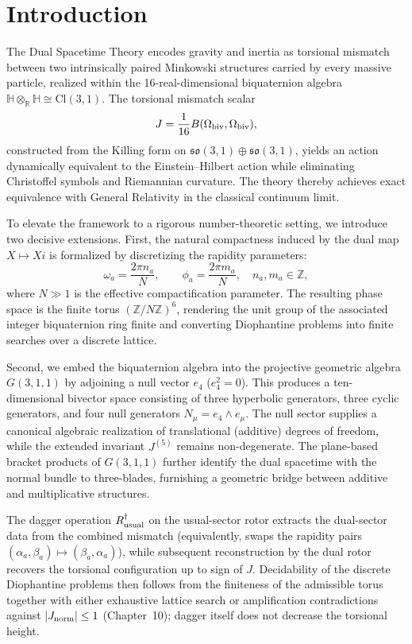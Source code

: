 \documentclass[dvipdfmx,a4paper]{article}
\theoremstyle{definition}
\theoremstyle{remark}
\newcommand{\Jnorm}{J_{\rm norm}}
\begin{document}
\section{Introduction}

The Dual Spacetime Theory encodes gravity and inertia as torsional mismatch between two intrinsically paired Minkowski structures carried by every massive particle, realized within the 16-real-dimensional biquaternion algebra \(\mathbb{H} \otimes_{\mathbb{R}} \mathbb{H} \cong \mathrm{Cl}(3,1)\). The torsional mismatch scalar
\[
J = \frac{1}{16} B(\Omega_{\rm biv}, \Omega_{\rm biv}),
\]
constructed from the Killing form on \(\mathfrak{so}(3,1) \oplus \mathfrak{so}(3,1)\), yields an action dynamically equivalent to the Einstein--Hilbert action while eliminating Christoffel symbols and Riemannian curvature. The theory thereby achieves exact equivalence with General Relativity in the classical continuum limit.

To elevate the framework to a rigorous number-theoretic setting, we introduce two decisive extensions. First, the natural compactness induced by the dual map \(X \mapsto Xi\) is formalized by discretizing the rapidity parameters:
\[
\omega_a = \frac{2\pi n_a}{N}, \qquad \phi_a = \frac{2\pi m_a}{N}, \quad n_a,m_a \in \mathbb{Z},
\]
where \(N \gg 1\) is the effective compactification parameter. The resulting phase space is the finite torus \((\mathbb{Z}/N\mathbb{Z})^6\), rendering the unit group of the associated integer biquaternion ring finite and converting Diophantine problems into finite searches over a discrete lattice.

Second, we embed the biquaternion algebra into the projective geometric algebra \(G(3,1,1)\) by adjoining a null vector \(e_4\) (\(e_4^2 = 0\)). This produces a ten-dimensional bivector space consisting of three hyperbolic generators, three cyclic generators, and four null generators \(N_\mu = e_4 \wedge e_\mu\). The null sector supplies a canonical algebraic realization of translational (additive) degrees of freedom, while the extended invariant \(J^{(5)}\) remains non-degenerate. The plane-based bracket products of \(G(3,1,1)\) further identify the dual spacetime with the normal bundle to three-blades, furnishing a geometric bridge between additive and multiplicative structures.

The dagger operation \(R_{\rm usual}^\dagger\) on the usual-sector rotor extracts the dual-sector data from the combined mismatch (equivalently, swaps the rapidity pairs \((\alpha_a,\beta_a)\mapsto(\beta_a,\alpha_a)\)), while subsequent reconstruction by the dual rotor recovers the torsional configuration up to sign of \(J\). Decidability of the discrete Diophantine problems then follows from the finiteness of the admissible torus together with either exhaustive lattice search or amplification contradictions against \(|\Jnorm|\le 1\) (Chapter~10); dagger itself does not decrease the torsional height.
\end{document}
